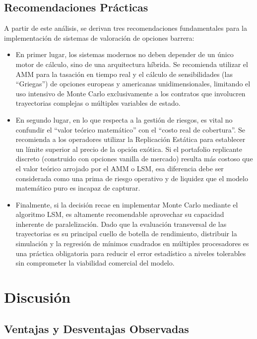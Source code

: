 \subsection{Recomendaciones Prácticas}

A partir de este análisis, se derivan tres recomendaciones fundamentales para la implementación de sistemas de valoración de opciones barrera:
\begin{itemize}
  \item En primer lugar, los sistemas modernos no deben depender de un único motor de cálculo, sino de una arquitectura híbrida. Se recomienda utilizar el AMM para la tasación en tiempo real y el cálculo de sensibilidades (las ``Griegas'') de opciones europeas y americanas unidimensionales, limitando el uso intensivo de Monte Carlo exclusivamente a los contratos que involucren trayectorias complejas o múltiples variables de estado.

  \item En segundo lugar, en lo que respecta a la gestión de riesgos, es vital no confundir el ``valor teórico matemático'' con el ``costo real de cobertura''. Se recomienda a los operadores utilizar la Replicación Estática para establecer un límite superior al precio de la opción exótica. Si el portafolio replicante discreto (construido con opciones vanilla de mercado) resulta más costoso que el valor teórico arrojado por el AMM o LSM, esa diferencia debe ser considerada como una prima de riesgo operativo y de liquidez que el modelo matemático puro es incapaz de capturar.
  
  \item Finalmente, si la decisión recae en implementar Monte Carlo mediante el algoritmo LSM, es altamente recomendable aprovechar su capacidad inherente de paralelización. Dado que la evaluación transversal de las trayectorias es su principal cuello de botella de rendimiento, distribuir la simulación y la regresión de mínimos cuadrados en múltiples procesadores es una práctica obligatoria para reducir el error estadístico a niveles tolerables sin comprometer la viabilidad comercial del modelo.
\end{itemize}

\section{Discusión}
\label{sec:discusion}

\subsection{Ventajas y Desventajas Observadas}

